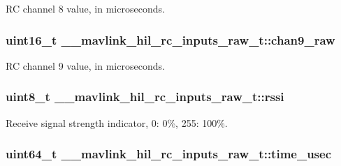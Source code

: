 R\+C channel 8 value, in microseconds. 

\hypertarget{struct____mavlink__hil__rc__inputs__raw__t_aebe7c293f27d5b25c78caa8f762c57e2}{
\subsubsection[{chan9\+\_\+raw}]{\setlength{\rightskip}{0pt plus 5cm}uint16\+\_\+t \+\_\+\+\_\+mavlink\+\_\+hil\+\_\+rc\+\_\+inputs\+\_\+raw\+\_\+t\+::chan9\+\_\+raw}}\label{struct____mavlink__hil__rc__inputs__raw__t_aebe7c293f27d5b25c78caa8f762c57e2}


R\+C channel 9 value, in microseconds. 

\hypertarget{struct____mavlink__hil__rc__inputs__raw__t_aa126d8b574a26544c57605c5aa1f8684}{
\subsubsection[{rssi}]{\setlength{\rightskip}{0pt plus 5cm}uint8\+\_\+t \+\_\+\+\_\+mavlink\+\_\+hil\+\_\+rc\+\_\+inputs\+\_\+raw\+\_\+t\+::rssi}}\label{struct____mavlink__hil__rc__inputs__raw__t_aa126d8b574a26544c57605c5aa1f8684}


Receive signal strength indicator, 0\+: 0\%, 255\+: 100\%. 

\hypertarget{struct____mavlink__hil__rc__inputs__raw__t_a17665e54cab99a69ff2e6d3b8ae63928}{
\subsubsection[{time\+\_\+usec}]{\setlength{\rightskip}{0pt plus 5cm}uint64\+\_\+t \+\_\+\+\_\+mavlink\+\_\+hil\+\_\+rc\+\_\+inputs\+\_\+raw\+\_\+t\+::time\+\_\+usec}}\label{struct____mavlink__hil__rc__inputs__raw__t_a17665e54cab99a69ff2e6d3b8ae63928}


